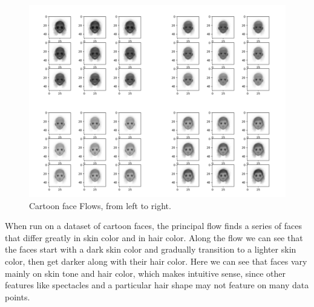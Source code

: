 \documentclass[12pt]{report}
\begin{document}
\begin{figure}[h]
    \begin{center}
        \includegraphics[scale=0.2]{main_cartoon_10_01.png}
        \caption{Cartoon face Flows, from left to right.}
        \label{fig:cartoonfaceflows}
    \end{center}
\end{figure}

When run on a dataset of cartoon faces, the principal flow finds a series of 
faces that differ greatly in skin color and in hair color. Along the flow 
we can see that the faces start with a dark skin color and gradually 
transition to a lighter skin color, then get darker along with their hair color. 
Here we can see that faces vary mainly on skin tone and hair color, which makes intuitive sense, 
since other features like spectacles and a particular hair shape may not feature on many
data points.
\fi
\end{document}
